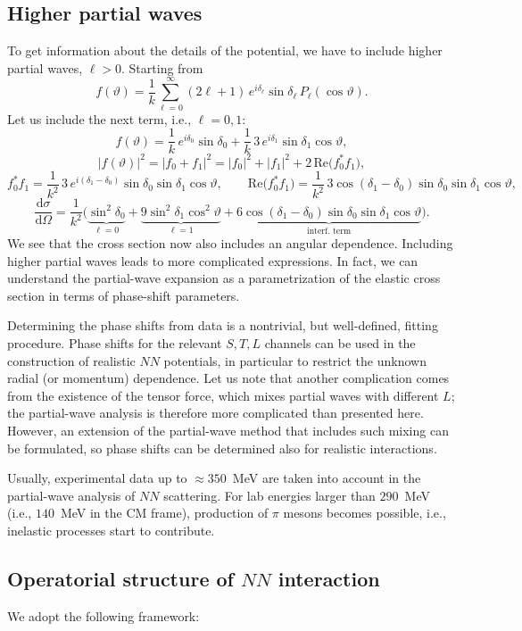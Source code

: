 \documentclass[11pt,a4paper]{article}
\newcommand{\ud}{\mathrm{d}}
\begin{document}
\subsection{Higher partial waves}

To get information about the details of the potential, we have to include
higher partial waves, $\ell>0$. Starting from
\[
f(\vartheta)=\frac1k\sum_{\ell=0}^{\infty}(2\ell+1)\,e^{i\delta_\ell}\sin\delta_\ell\,P_\ell(\cos\vartheta).
\]
Let us include the next term, i.e., $\ell=0,1$:
\[
f(\vartheta)=\frac1k\,e^{i\delta_0}\sin\delta_0+\frac1k\,3\,e^{i\delta_1}\sin\delta_1\cos\vartheta ,
\]
\[
|f(\vartheta)|^2=|f_0+f_1|^2=|f_0|^2+|f_1|^2+2\,\mathrm{Re}\big(f_0^*f_1\big),
\]
\[
f_0^*f_1=\frac{1}{k^2}\,3\,e^{i(\delta_1-\delta_0)}\sin\delta_0\sin\delta_1\cos\vartheta,
\qquad
\mathrm{Re}\big(f_0^*f_1\big)=\frac{1}{k^2}\,3\cos(\delta_1-\delta_0)\sin\delta_0\sin\delta_1\cos\vartheta,
\]
\[
\frac{\ud\sigma}{\ud\Omega}=\frac{1}{k^2}\Big(
\underbrace{\sin^2\delta_0}_{\ell=0}+\underbrace{9\sin^2\delta_1\cos^2\vartheta}_{\ell=1}
+\underbrace{6\cos(\delta_1-\delta_0)\sin\delta_0\sin\delta_1\cos\vartheta}_{\text{interf.\ term}}\Big).
\]
We see that the cross section now also includes an angular dependence. Including higher partial waves leads to more complicated expressions. In fact, we can understand the partial-wave expansion as a parametrization of the elastic cross section in terms of phase-shift parameters. 

Determining the phase shifts from data is a nontrivial, but well-defined, fitting procedure. Phase shifts for the relevant $S,T,L$ channels can be used in the construction of realistic $NN$ potentials, in particular to restrict the unknown radial (or momentum) dependence. Let us note that another complication comes from the existence of the tensor force, which mixes partial waves with different $L$; the partial-wave analysis is therefore more complicated than presented here. However, an extension of the partial-wave method that includes such mixing can be formulated, so phase shifts can be determined also for realistic interactions.

Usually, experimental data up to $\approx350$~MeV are taken into account in the partial-wave analysis of $NN$ scattering. For lab energies larger than $290$~MeV (i.e., $140$~MeV in the CM frame), production of $\pi$ mesons becomes possible, i.e., inelastic processes start to contribute.  

\subsection{Operatorial structure of \texorpdfstring{$NN$}{NN} interaction}
We adopt the following framework:
\end{document}

